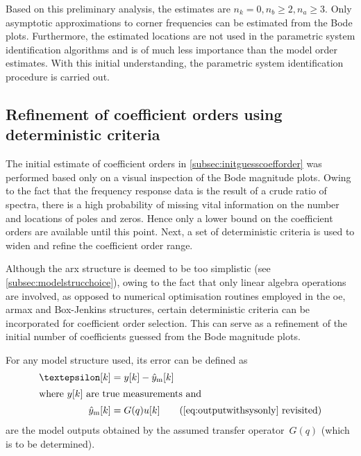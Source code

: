 
Based on this preliminary  analysis, the estimates are $n_k = 0,  n_b \ge 2, n_a
\ge 3$.  Only asymptotic approximations  to corner frequencies can  be estimated
from the  Bode plots. Furthermore, the  estimated locations are not  used in the
parametric system identification algorithms and  is of much less importance than
the  model order  estimates.  With this  initial  understanding, the  parametric
system identification procedure is carried out.

\subsection{Refinement of coefficient orders using deterministic criteria}\label{subsec:refinementofcoefforder}

The initial estimate  of coefficient orders in \cref{subsec:initguesscoefforder}
was performed  based only on  a visual inspection  of the Bode  magnitude plots.
Owing to  the fact that  the frequency  response data is  the result of  a crude
ratio of  spectra, there is a  high probability of missing  vital information on
the number and locations of poles and zeros. Hence only a lower bound on the
coefficient orders are available until this point. Next, a set of deterministic
criteria is used to widen and refine the coefficient order range.


Although   the   \gls{arx}   structure   is  deemed   to   be   too   simplistic
(see \cref{subsec:modelstrucchoice}), owing to the fact that only linear algebra
operations are involved, as opposed  to numerical optimisation routines employed
in the  \gls{oe}, \gls{armax} and Box-Jenkins  structures, certain deterministic
criteria can  be incorporated  for coefficient order selection. This  can serve
as  a  refinement  of  the initial number of  coefficients guessed from the Bode
magnitude plots.

For any model structure used, its error can be defined as
\begin{align}
    \varepsilon[k]      & = y[k] - \hat{y}_\text{m}[k] \label{eq:sysiderroronlyk}\\
    \shortintertext{where $y[k]$ are true measurements and}
    \hat{y}_\text{m}[k] & = G(q)u[k] \tag{\cref{eq:outputwithsysonly} revisited}
\end{align}
are the model outputs obtained by the assumed transfer operator~$G(q)$ (which is
to be determined).

